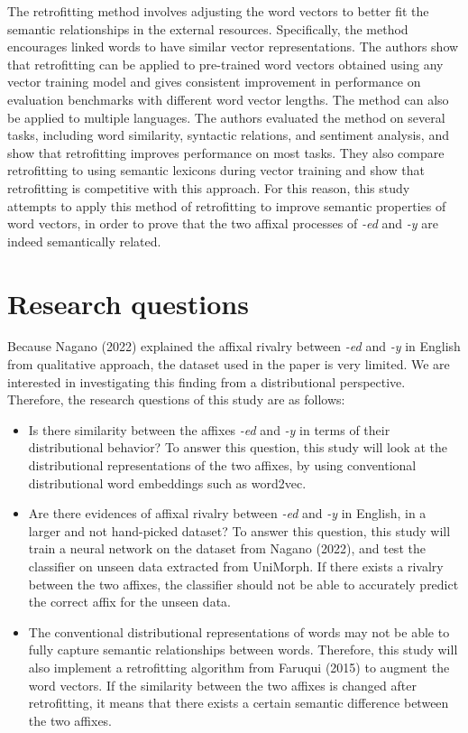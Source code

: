 \documentclass[12pt]{article}
\begin{document}
The retrofitting method involves adjusting the word vectors to better fit the semantic relationships in the external resources. Specifically, the method encourages linked words to have similar vector representations. The authors show that retrofitting can be applied to pre-trained word vectors obtained using any vector training model and gives consistent improvement in performance on evaluation benchmarks with different word vector lengths. The method can also be applied to multiple languages. The authors evaluated the method on several tasks, including word similarity, syntactic relations, and sentiment analysis, and show that retrofitting improves performance on most tasks. They also compare retrofitting to using semantic lexicons during vector training and show that retrofitting is competitive with this approach. For this reason, this study attempts to apply this method of retrofitting to improve semantic properties of word vectors, in order to prove that the two affixal processes of \emph{-ed} and \emph{-y} are indeed semantically related.


\section{Research questions}
    Because Nagano (2022) explained the affixal rivalry between \emph{-ed} and \emph{-y} in English from  qualitative approach, the dataset used in the paper is very limited. We are interested in investigating this finding from a distributional perspective. Therefore, the research questions of this study are as follows:
    \begin{itemize}
        \item Is there similarity between the affixes \emph{-ed} and \emph{-y} in terms of their distributional behavior? To answer this question, this study will look at the distributional representations of the two affixes, by using conventional distributional word embeddings such as word2vec.
        \item Are there evidences of affixal rivalry between \emph{-ed} and \emph{-y} in English, in a larger and not hand-picked dataset? To answer this question, this study will train a neural network on the dataset from Nagano (2022), and test the classifier on unseen data extracted from UniMorph. If there exists a rivalry between the two affixes, the classifier should not be able to accurately predict the correct affix for the unseen data.
        \item The conventional distributional representations of words may not be able to fully capture semantic relationships between words. Therefore, this study will also implement a retrofitting algorithm from Faruqui (2015) to augment the word vectors. If the similarity between the two affixes is changed after retrofitting, it means that there exists a certain semantic difference between the two affixes.
    \end{itemize}
\end{document}
